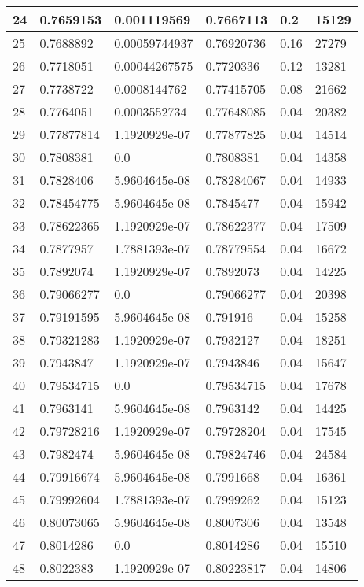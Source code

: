 \begin{longtable}{|l|l|l|l|l|l|}
24 & 0.7659153 & 0.001119569 & 0.7667113 & 0.2 & 15129 \\ \hline 
25 & 0.7688892 & 0.00059744937 & 0.76920736 & 0.16 & 27279 \\ \hline 
26 & 0.7718051 & 0.00044267575 & 0.7720336 & 0.12 & 13281 \\ \hline 
27 & 0.7738722 & 0.0008144762 & 0.77415705 & 0.08 & 21662 \\ \hline 
28 & 0.7764051 & 0.0003552734 & 0.77648085 & 0.04 & 20382 \\ \hline 
29 & 0.77877814 & 1.1920929e-07 & 0.77877825 & 0.04 & 14514 \\ \hline 
30 & 0.7808381 & 0.0 & 0.7808381 & 0.04 & 14358 \\ \hline 
31 & 0.7828406 & 5.9604645e-08 & 0.78284067 & 0.04 & 14933 \\ \hline 
32 & 0.78454775 & 5.9604645e-08 & 0.7845477 & 0.04 & 15942 \\ \hline 
33 & 0.78622365 & 1.1920929e-07 & 0.78622377 & 0.04 & 17509 \\ \hline 
34 & 0.7877957 & 1.7881393e-07 & 0.78779554 & 0.04 & 16672 \\ \hline 
35 & 0.7892074 & 1.1920929e-07 & 0.7892073 & 0.04 & 14225 \\ \hline 
36 & 0.79066277 & 0.0 & 0.79066277 & 0.04 & 20398 \\ \hline 
37 & 0.79191595 & 5.9604645e-08 & 0.791916 & 0.04 & 15258 \\ \hline 
38 & 0.79321283 & 1.1920929e-07 & 0.7932127 & 0.04 & 18251 \\ \hline 
39 & 0.7943847 & 1.1920929e-07 & 0.7943846 & 0.04 & 15647 \\ \hline 
40 & 0.79534715 & 0.0 & 0.79534715 & 0.04 & 17678 \\ \hline 
41 & 0.7963141 & 5.9604645e-08 & 0.7963142 & 0.04 & 14425 \\ \hline 
42 & 0.79728216 & 1.1920929e-07 & 0.79728204 & 0.04 & 17545 \\ \hline 
43 & 0.7982474 & 5.9604645e-08 & 0.79824746 & 0.04 & 24584 \\ \hline 
44 & 0.79916674 & 5.9604645e-08 & 0.7991668 & 0.04 & 16361 \\ \hline 
45 & 0.79992604 & 1.7881393e-07 & 0.7999262 & 0.04 & 15123 \\ \hline 
46 & 0.80073065 & 5.9604645e-08 & 0.8007306 & 0.04 & 13548 \\ \hline 
47 & 0.8014286 & 0.0 & 0.8014286 & 0.04 & 15510 \\ \hline 
48 & 0.8022383 & 1.1920929e-07 & 0.80223817 & 0.04 & 14806 \\ \hline 

\end{longtable}
